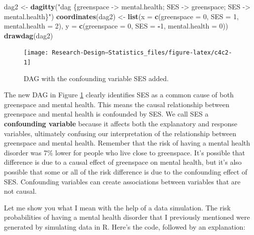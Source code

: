 \documentclass[
]{book}
\newenvironment{Shaded}{\begin{snugshade}}{\end{snugshade}}
\newcommand{\AttributeTok}[1]{\textcolor[rgb]{0.13,0.29,0.53}{#1}}
\newcommand{\DecValTok}[1]{\textcolor[rgb]{0.00,0.00,0.81}{#1}}
\newcommand{\FunctionTok}[1]{\textcolor[rgb]{0.13,0.29,0.53}{\textbf{#1}}}
\newcommand{\NormalTok}[1]{#1}
\newcommand{\OtherTok}[1]{\textcolor[rgb]{0.56,0.35,0.01}{#1}}
\newcommand{\SpecialCharTok}[1]{\textcolor[rgb]{0.81,0.36,0.00}{\textbf{#1}}}
\newcommand{\StringTok}[1]{\textcolor[rgb]{0.31,0.60,0.02}{#1}}
\begin{document}
\begin{Shaded}
\begin{Highlighting}[]
\NormalTok{dag2 }\OtherTok{\textless{}{-}} \FunctionTok{dagitty}\NormalTok{(}\StringTok{"dag \{greenspace {-}\textgreater{} mental.health;}
\StringTok{                      SES {-}\textgreater{} greenspace;}
\StringTok{                      SES {-}\textgreater{} mental.health\}"}\NormalTok{)}
\FunctionTok{coordinates}\NormalTok{(dag2) }\OtherTok{\textless{}{-}} \FunctionTok{list}\NormalTok{(}\AttributeTok{x =} \FunctionTok{c}\NormalTok{(}\AttributeTok{greenspace =} \DecValTok{0}\NormalTok{, }\AttributeTok{SES =} \DecValTok{1}\NormalTok{, }\AttributeTok{mental.health =} \DecValTok{2}\NormalTok{), }
                          \AttributeTok{y =} \FunctionTok{c}\NormalTok{(}\AttributeTok{greenspace =} \DecValTok{0}\NormalTok{, }\AttributeTok{SES =} \SpecialCharTok{{-}}\DecValTok{1}\NormalTok{, }\AttributeTok{mental.health =} \DecValTok{0}\NormalTok{))}
\FunctionTok{drawdag}\NormalTok{(dag2)}
\end{Highlighting}
\end{Shaded}

\begin{figure}

{\centering \texttt{[image: Research-Design---Statistics\_files/figure-latex/c4c2-1]} 

}

\caption{DAG with the confounding variable SES added.}\label{fig:c4c2}
\end{figure}

The new DAG in Figure \ref{fig:c4c2} clearly identifies SES as a common cause of both greenspace and mental health. This means the causal relationship between greenspace and mental health is confounded by SES. We call SES a \textbf{confounding variable} because it affects both the explanatory and response variables, ultimately confusing our interpretation of the relationship between greenspace and mental health. Remember that the risk of having a mental health disorder was 7\% lower for people who live close to greenspace. It's possible that difference is due to a causal effect of greenspace on mental health, but it's also possible that some or all of the risk difference is due to the confounding effect of SES. Confounding variables can create associations between variables that are not causal.

Let me show you what I mean with the help of a data simulation. The risk probabilities of having a mental health disorder that I previously mentioned were generated by simulating data in R. Here's the code, followed by an explanation:
\end{document}
